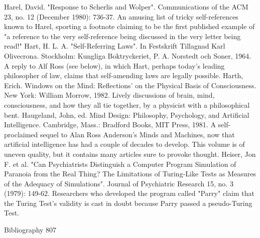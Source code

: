 Harel, David. "Response to Scherlis and Wolper". Communications of the ACM 23, no. 12
 (December 1980): 736-37. An amusing list of tricky self-references known to Harel,
 sporting a footnote claiming to be the first published example of "a reference to the very
 self-reference being discussed in the very letter being read!"
Hart, H. L. A. "Self-Referring Laws". In Festskrift Tillagnad Karl Olivecrona. Stockholm:
 Kungliga Boktryckeriet, P. A. Norstedt och Soner, 1964. A reply to Alf Ross (see below), in
 which Hart, perhaps today's leading philosopher of law, claims that self-amending laws are
 legally possible.
Harth, Erich. Windows on the Mind: Reflections' on the Physical Basis of Consciousness.
 New York: William Morrow, 1982. Lively discussions of brain, mind, consciousness, and
 how they all tie together, by a physicist with a philosophical bent.
Haugeland, John, ed. Mind Design: Philosophy, Psychology, and Artificial Intelligence.
 Cambridge, Mass.: Bradford Books, MIT Press, 1981. A self-proclaimed sequel to Alan
 Ross Anderson's Minds and Machines, now that artificial intelligence has had a couple of
 decades to develop. This volume is of uneven quality, but it contains many articles sure to
 provoke thought.
Heiser, Jon F. et al. "Can Psychiatrists Distinguish a Computer Program Simulation of
 Paranoia from the Real Thing? The Limitations of Turing-Like Tests as Measures of the
 Adequacy of Simulations". Journal of Psychiatric Research 15, no. 3 (1979): 149-62.
 Researchers who developed the program called "Parry" claim that the Turing Test's validity
 is cast in doubt because Parry passed a pseudo-Turing Test.

Bibliography                                                                              807

